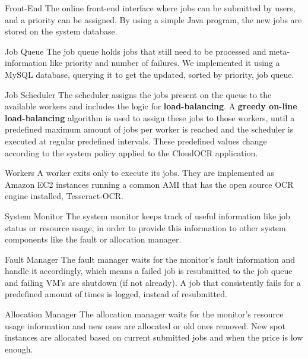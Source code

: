 \documentclass[a4paper]{IEEEtran}
\begin{document}
\begin{LaTeXdescription}

\item[Front-End]
The online front-end interface where jobs can be submitted by users, and a priority can be assigned. By using a simple Java program, the new jobs are stored on the system database.

\item[Job Queue]
The job queue holds jobs that still need to be processed and meta-information like priority and number of failures. We implemented it using a MySQL database, querying it to get the updated, sorted by priority, job queue.

\item[Job Scheduler]
The scheduler assigns the jobs present on the queue to the available workers and includes the logic for \textbf{load-balancing}. A \textbf{greedy on-line load-balancing} algorithm \cite{kleinberg2006} is used to assign these jobs to those workers, until a predefined maximum amount of jobs per worker is reached and the scheduler is executed at regular predefined intervals.
These predefined values change according to the system policy applied to the CloudOCR application.

\item[Workers]
A worker exits only to execute its jobs. They are implemented as Amazon EC2 instances running a common AMI that has the open source OCR engine installed, Tesseract-OCR.

\item[System Monitor]
The system monitor keeps track of useful information like job status or resource usage, in order to provide this information to other system components like the fault or allocation manager.

\item[Fault Manager]
The fault manager waits for the monitor's fault information and handle it accordingly, which means a failed job is resubmitted to the job queue and failing VM's are shutdown (if not already). A job that consistently fails for a predefined amount of times is logged, instead of resubmitted.

\item[Allocation Manager]
The allocation manager waits for the monitor's resource usage information and new ones are allocated or old ones removed. New spot instances are allocated based on current submitted jobs and when the price is low enough.

\end{LaTeXdescription}
\end{document}
